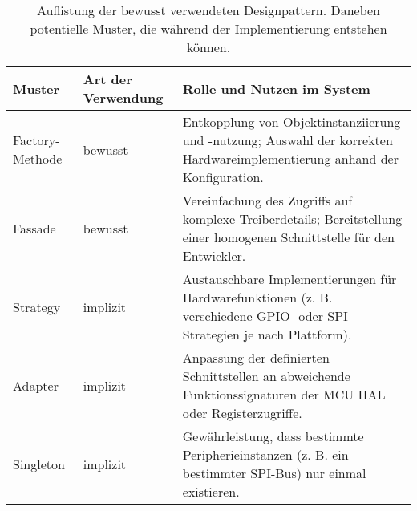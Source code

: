 \begin{table}[H]
	\begin{center}
		\begin{tabular}{p{3cm} | p{4cm} | p{7cm}}
		\toprule
			\textbf{Muster} & \textbf{Art der Verwendung} & \textbf{Rolle und Nutzen im System} \\
			\midrule
			Factory-Methode & bewusst & Entkopplung von Objektinstanziierung und -nutzung; Auswahl der korrekten Hardwareimplementierung anhand der Konfiguration. \\
			Fassade & bewusst & Vereinfachung des Zugriffs auf komplexe Treiberdetails; Bereitstellung einer homogenen Schnittstelle für den Entwickler. \\
			Strategy & implizit & Austauschbare Implementierungen für Hardwarefunktionen (z. B. verschiedene GPIO- oder SPI-Strategien je nach Plattform). \\
			Adapter & implizit & Anpassung der definierten Schnittstellen an abweichende Funktionssignaturen der MCU HAL oder Registerzugriffe. \\
			Singleton & implizit & Gewährleistung, dass bestimmte Peripherieinstanzen (z. B. ein bestimmter SPI-Bus) nur einmal existieren. \\
			\bottomrule
		\end{tabular}
		\caption{Auflistung der bewusst verwendeten Designpattern. Daneben potentielle Muster, die während der Implementierung entstehen können.}
		\label{tab:unconsious_design_pattern}
	\end{center}
\end{table}



























